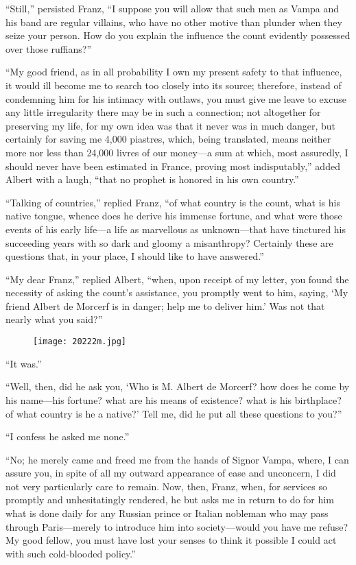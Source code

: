 “Still,” persisted Franz, “I suppose you will allow that such men as
Vampa and his band are regular villains, who have no other motive than
plunder when they seize your person. How do you explain the influence
the count evidently possessed over those ruffians?”

“My good friend, as in all probability I own my present safety to that
influence, it would ill become me to search too closely into its
source; therefore, instead of condemning him for his intimacy with
outlaws, you must give me leave to excuse any little irregularity there
may be in such a connection; not altogether for preserving my life, for
my own idea was that it never was in much danger, but certainly for
saving me 4,000 piastres, which, being translated, means neither more
nor less than 24,000 livres of our money—a sum at which, most
assuredly, I should never have been estimated in France, proving most
indisputably,” added Albert with a laugh, “that no prophet is honored
in his own country.”

“Talking of countries,” replied Franz, “of what country is the count,
what is his native tongue, whence does he derive his immense fortune,
and what were those events of his early life—a life as marvellous as
unknown—that have tinctured his succeeding years with so dark and
gloomy a misanthropy? Certainly these are questions that, in your
place, I should like to have answered.”

“My dear Franz,” replied Albert, “when, upon receipt of my letter, you
found the necessity of asking the count’s assistance, you promptly went
to him, saying, ‘My friend Albert de Morcerf is in danger; help me to
deliver him.’ Was not that nearly what you said?”

\begin{figure}[ht]
\texttt{[image: 20222m.jpg]}
\end{figure}

“It was.”

“Well, then, did he ask you, ‘Who is M. Albert de Morcerf? how does he
come by his name—his fortune? what are his means of existence? what is
his birthplace? of what country is he a native?’ Tell me, did he put
all these questions to you?”

“I confess he asked me none.”

“No; he merely came and freed me from the hands of Signor Vampa, where,
I can assure you, in spite of all my outward appearance of ease and
unconcern, I did not very particularly care to remain. Now, then,
Franz, when, for services so promptly and unhesitatingly rendered, he
but asks me in return to do for him what is done daily for any Russian
prince or Italian nobleman who may pass through Paris—merely to
introduce him into society—would you have me refuse? My good fellow,
you must have lost your senses to think it possible I could act with
such cold-blooded policy.”

